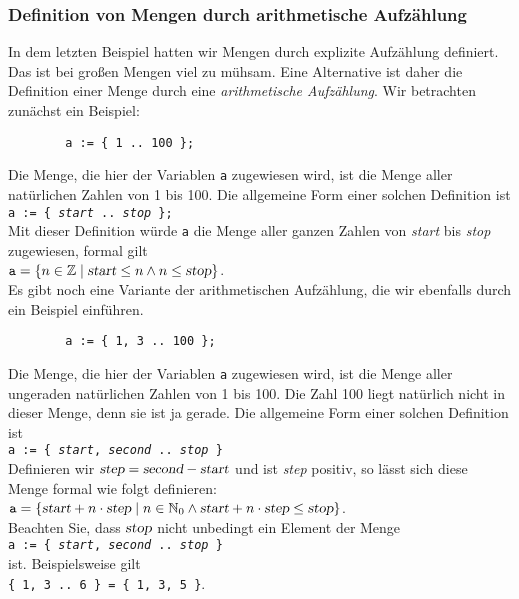 \subsubsection{Definition von Mengen durch arithmetische Aufzählung}
In dem letzten Beispiel hatten wir Mengen durch explizite Aufzählung definiert.  Das ist
bei großen Mengen viel zu mühsam.  Eine Alternative ist daher die Definition einer Menge
durch eine \emph{arithmetische Aufzählung}.  Wir betrachten zunächst ein Beispiel: 
\begin{verbatim}
        a := { 1 .. 100 };
\end{verbatim}
Die Menge, die hier der Variablen \texttt{a} zugewiesen wird, ist die Menge aller
natürlichen Zahlen von 1 bis 100.  Die allgemeine Form einer solchen Definition ist \\[0.2cm]
\hspace*{1.3cm} \texttt{a := \{ \textsl{start} .. \textsl{stop} \};} \\[0.2cm]
Mit dieser Definition würde \texttt{a} die Menge aller ganzen Zahlen von
\textsl{start} bis \textsl{stop} zugewiesen, formal gilt \\[0.2cm]
\hspace*{1.3cm} $\texttt{a} = \{ n \in \mathbb{Z} \mid \textsl{start} \leq n \wedge n \leq\textsl{stop} \}$. \\[0.2cm]
Es gibt noch eine Variante der arithmetischen Aufzählung, die wir ebenfalls durch ein
Beispiel einführen. 
\begin{verbatim}
        a := { 1, 3 .. 100 };
\end{verbatim}
Die Menge, die hier der Variablen \texttt{a} zugewiesen wird, ist die Menge aller
ungeraden natürlichen Zahlen von 1 bis 100.  Die Zahl 100 liegt natürlich nicht
in dieser Menge, denn sie ist ja gerade.
Die allgemeine Form einer solchen Definition ist \\[0.2cm]
\hspace*{1.3cm} 
\texttt{a := \{ \textsl{start}, \textsl{second} .. \textsl{stop} \}} \\[0.2cm]
Definieren wir $\textsl{step} = \textsl{second} - \textsl{start}$ und ist \textsl{step} positiv, so lässt sich
diese Menge formal wie folgt definieren: 
\\[0.2cm]
\hspace*{1.3cm} 
$\texttt{a} = \{ \textsl{start} + n \cdot \textsl{step} \mid n \in \mathbb{N}_0 \wedge \textsl{start} + n \cdot \textsl{step} \leq\textsl{stop} \}$. 
\\[0.2cm]
Beachten Sie, dass $\textsl{stop}$ nicht unbedingt ein Element der Menge 
\\[0.2cm]
\hspace*{1.3cm}
\texttt{a := \{ \textsl{start}, \textsl{second} .. \textsl{stop} \}} 
\\[0.2cm]
ist.  Beispielsweise gilt
\\[0.2cm]
\hspace*{1.3cm}
\texttt{\{ 1, 3 .. 6 \} = \{ 1, 3, 5 \}}.


